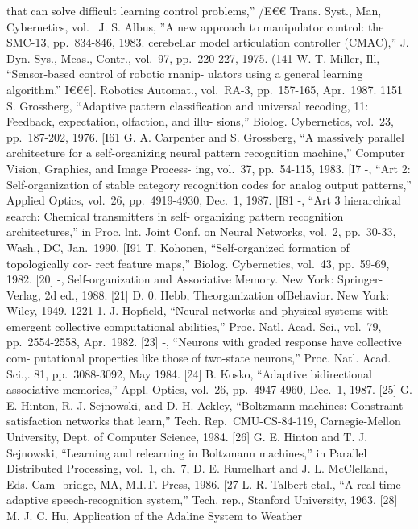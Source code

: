 that can solve difficult learning control problems,'' /E€€ Trans. Syst.,
Man, Cybernetics, vol.~ J. S. Albus, ''A new approach to manipulator
control: the SMC-13, pp.~834-846, 1983. cerebellar model articulation
controller (CMAC),'' J. Dyn. Sys., Meas., Contr., vol.~97, pp.~220-227,
1975. (141 W. T. Miller, Ill, ``Sensor-based control of robotic rnanip-
ulators using a general learning algorithm.'' I€€€{]}. Robotics
Automat., vol.~RA-3, pp.~157-165, Apr.~1987. 1151 S. Grossberg,
``Adaptive pattern classification and universal recoding, 11: Feedback,
expectation, olfaction, and illu- sions,'' Biolog. Cybernetics, vol.~23,
pp.~187-202, 1976. {[}I61 G. A. Carpenter and S. Grossberg, ``A
massively parallel architecture for a self-organizing neural pattern
recognition machine,'' Computer Vision, Graphics, and Image Process-
ing, vol.~37, pp.~54-115, 1983. {[}I7 -, ``Art 2: Self-organization of
stable category recognition codes for analog output patterns,'' Applied
Optics, vol.~26, pp.~4919-4930, Dec.~1, 1987. {[}I81 -, ``Art 3
hierarchical search: Chemical transmitters in self- organizing pattern
recognition architectures,'' in Proc. lnt. Joint Conf. on Neural
Networks, vol.~2, pp.~30-33, Wash., DC, Jan.~1990. {[}I91 T. Kohonen,
``Self-organized formation of topologically cor- rect feature maps,''
Biolog. Cybernetics, vol.~43, pp.~59-69, 1982. {[}20{]} -,
Self-organization and Associative Memory. New York: Springer-Verlag, 2d
ed., 1988. {[}21{]} D. 0. Hebb, Theorganization ofBehavior. New York:
Wiley, 1949. 1221 1. J. Hopfield, ``Neural networks and physical systems
with emergent collective computational abilities,'' Proc. Natl. Acad.
Sci., vol.~79, pp.~2554-2558, Apr.~1982. {[}23{]} -, ``Neurons with
graded response have collective com- putational properties like those of
two-state neurons,'' Proc. Natl. Acad. Sci.,\ol. 81, pp.~3088-3092, May
1984. {[}24{]} B. Kosko, ``Adaptive bidirectional associative
memories,'' Appl. Optics, vol.~26, pp.~4947-4960, Dec.~1, 1987. {[}25{]}
G. E. Hinton, R. J. Sejnowski, and D. H. Ackley, ``Boltzmann machines:
Constraint satisfaction networks that learn,'' Tech. Rep.~CMU-CS-84-119,
Carnegie-Mellon University, Dept. of Computer Science, 1984. {[}26{]} G.
E. Hinton and T. J. Sejnowski, ``Learning and relearning in Boltzmann
machines,'' in Parallel Distributed Processing, vol.~1, ch.~7, D. E.
Rumelhart and J. L. McClelland, Eds. Cam- bridge, MA, M.I.T. Press,
1986. {[}27 L. R. Talbert etal., ``A real-time adaptive
speech-recognition system,'' Tech. rep., Stanford University, 1963.
{[}28{]} M. J. C. Hu, Application of the Adaline System to Weather
